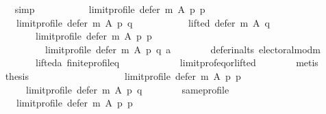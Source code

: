\begin{isabellebody}
\ \ \ \ \ \ \isamarkupfalse%
\ simp\isanewline
\ \ \ \ \isamarkupfalse%
\isanewline
\ \ \ \ \ \ {\isachardoublequoteopen}{\isacharparenleft}{\kern0pt}limit{\isacharunderscore}{\kern0pt}profile\ {\isacharparenleft}{\kern0pt}defer\ m\ A\ p{\isacharparenright}{\kern0pt}\ p{\isacharparenright}{\kern0pt}\ {\isacharequal}{\kern0pt}\isanewline
\ \ \ \ \ \ \ \ {\isacharparenleft}{\kern0pt}limit{\isacharunderscore}{\kern0pt}profile\ {\isacharparenleft}{\kern0pt}defer\ m\ A\ p{\isacharparenright}{\kern0pt}\ q{\isacharparenright}{\kern0pt}\ {\isasymor}\isanewline
\ \ \ \ \ \ \ \ \ \ lifted\ {\isacharparenleft}{\kern0pt}defer\ m\ A\ q{\isacharparenright}{\kern0pt}\isanewline
\ \ \ \ \ \ \ \ \ \ \ \ {\isacharparenleft}{\kern0pt}limit{\isacharunderscore}{\kern0pt}profile\ {\isacharparenleft}{\kern0pt}defer\ m\ A\ p{\isacharparenright}{\kern0pt}\ p{\isacharparenright}{\kern0pt}\isanewline
\ \ \ \ \ \ \ \ \ \ \ \ \ \ {\isacharparenleft}{\kern0pt}limit{\isacharunderscore}{\kern0pt}profile\ {\isacharparenleft}{\kern0pt}defer\ m\ A\ p{\isacharparenright}{\kern0pt}\ q{\isacharparenright}{\kern0pt}\ a{\isachardoublequoteclose}\isanewline
\ \ \ \ \ \ \isamarkupfalse%
\ defer{\isacharunderscore}{\kern0pt}in{\isacharunderscore}{\kern0pt}alts\ electoral{\isacharunderscore}{\kern0pt}mod{\isacharunderscore}{\kern0pt}m\isanewline
\ \ \ \ \ \ \ \ \ \ \ \ lifted{\isacharunderscore}{\kern0pt}a\ finite{\isacharunderscore}{\kern0pt}profile{\isacharunderscore}{\kern0pt}q\isanewline
\ \ \ \ \ \ \ \ \ \ \ \ limit{\isacharunderscore}{\kern0pt}prof{\isacharunderscore}{\kern0pt}eq{\isacharunderscore}{\kern0pt}or{\isacharunderscore}{\kern0pt}lifted\isanewline
\ \ \ \ \ \ \isamarkupfalse%
\ metis\isanewline
\ \ \ \ \isamarkupfalse%
\ {\isacharquery}{\kern0pt}thesis\isanewline
\ \ \ \ \isamarkupfalse%
\isanewline
\ \ \ \ \ \ \isamarkupfalse%
\isanewline
\ \ \ \ \ \ \ \ {\isachardoublequoteopen}limit{\isacharunderscore}{\kern0pt}profile\ {\isacharparenleft}{\kern0pt}defer\ m\ A\ p{\isacharparenright}{\kern0pt}\ p\ {\isacharequal}{\kern0pt}\isanewline
\ \ \ \ \ \ \ \ \ \ limit{\isacharunderscore}{\kern0pt}profile\ {\isacharparenleft}{\kern0pt}defer\ m\ A\ p{\isacharparenright}{\kern0pt}\ q{\isachardoublequoteclose}\isanewline
\ \ \ \ \ \ \isamarkupfalse%
\ same{\isacharunderscore}{\kern0pt}profile{\isacharcolon}{\kern0pt}\isanewline
\ \ \ \ \ \ \ \ {\isachardoublequoteopen}limit{\isacharunderscore}{\kern0pt}profile\ {\isacharparenleft}{\kern0pt}defer\ m\ A\ p{\isacharparenright}{\kern0pt}\ p\ {\isacharequal}{\kern0pt}\isanewline

\end{isabellebody}
